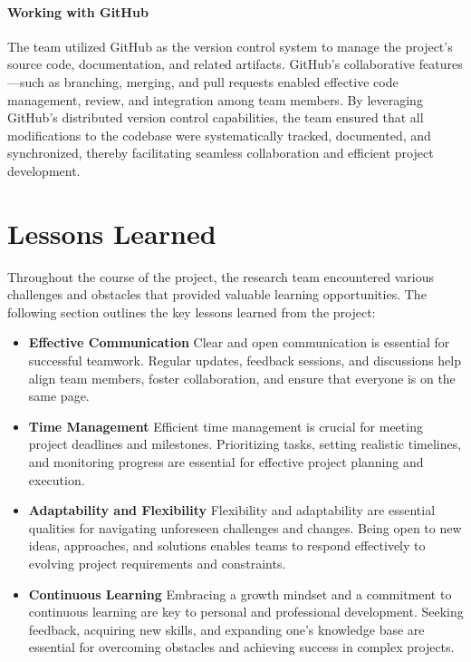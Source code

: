 \paragraph{Working with GitHub}  
The team utilized GitHub as the version control system to manage the project’s source code, documentation, and related artifacts. GitHub’s collaborative features—such as branching, merging, and pull requests enabled effective code management, review, and integration among team members. By leveraging GitHub’s distributed version control capabilities, the team ensured that all modifications to the codebase were systematically tracked, documented, and synchronized, thereby facilitating seamless collaboration and efficient project development.

\section{Lessons Learned}

Throughout the course of the project, the research team encountered various challenges and obstacles that provided valuable learning opportunities. 
The following section outlines the key lessons learned from the project:

\begin{itemize}
    \item \textbf{Effective Communication} Clear and open communication is essential for successful teamwork. Regular updates, feedback sessions, and discussions help align team members, foster collaboration, and ensure that everyone is on the same page.
    \item \textbf{Time Management} Efficient time management is crucial for meeting project deadlines and milestones. Prioritizing tasks, setting realistic timelines, and monitoring progress are essential for effective project planning and execution.
    \item \textbf{Adaptability and Flexibility} Flexibility and adaptability are essential qualities for navigating unforeseen challenges and changes. Being open to new ideas, approaches, and solutions enables teams to respond effectively to evolving project requirements and constraints.
    \item \textbf{Continuous Learning} Embracing a growth mindset and a commitment to continuous learning are key to personal and professional development. Seeking feedback, acquiring new skills, and expanding one’s knowledge base are essential for overcoming obstacles and achieving success in complex projects.
\end{itemize}







